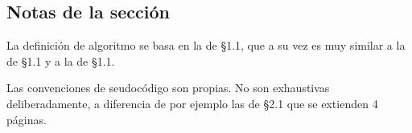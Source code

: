 \subsection*{Notas de la sección}

La definición de algoritmo se basa en la de \textcite{cormen} \S 1.1, que a su vez es muy similar a la de \textcite{cardoso} \S 1.1 y a la de \textcite{levitin} \S 1.1.

Las convenciones de seudocódigo son propias. No son exhaustivas deliberadamente, a diferencia de por ejemplo las de \textcite{cormen2022} \S 2.1 que se extienden 4 páginas.